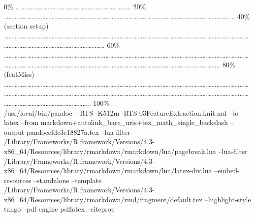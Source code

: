 \documentclass[
]{article}
\begin{document}
\textbar{} \textbar{} \textbar{} 0\% \textbar{}
\textbar\ldots\ldots\ldots\ldots\ldots\ldots\ldots\ldots\ldots\ldots\ldots\ldots\ldots\ldots\ldots\ldots\ldots\ldots\ldots\ldots\ldots\ldots\ldots\ldots\ldots{}
\textbar{} 20\% \textbar{}
\textbar\ldots\ldots\ldots\ldots\ldots\ldots\ldots\ldots\ldots\ldots\ldots\ldots\ldots\ldots\ldots\ldots\ldots\ldots\ldots\ldots\ldots\ldots\ldots\ldots\ldots\ldots\ldots\ldots\ldots\ldots\ldots\ldots\ldots\ldots\ldots\ldots\ldots\ldots\ldots\ldots\ldots\ldots\ldots\ldots\ldots\ldots\ldots\ldots\ldots\ldots{}
\textbar{} 40\% (section setup) \textbar{}
\textbar\ldots\ldots\ldots\ldots\ldots\ldots\ldots\ldots\ldots\ldots\ldots\ldots\ldots\ldots\ldots\ldots\ldots\ldots\ldots\ldots\ldots\ldots\ldots\ldots\ldots\ldots\ldots\ldots\ldots\ldots\ldots\ldots\ldots\ldots\ldots\ldots\ldots\ldots\ldots\ldots\ldots\ldots\ldots\ldots\ldots\ldots\ldots\ldots\ldots\ldots\ldots\ldots\ldots\ldots\ldots\ldots\ldots\ldots\ldots\ldots\ldots\ldots\ldots\ldots\ldots\ldots\ldots\ldots\ldots\ldots\ldots\ldots\ldots\ldots..
\textbar{} 60\% \textbar{}
\textbar\ldots\ldots\ldots\ldots\ldots\ldots\ldots\ldots\ldots\ldots\ldots\ldots\ldots\ldots\ldots\ldots\ldots\ldots\ldots\ldots\ldots\ldots\ldots\ldots\ldots\ldots\ldots\ldots\ldots\ldots\ldots\ldots\ldots\ldots\ldots\ldots\ldots\ldots\ldots\ldots\ldots\ldots\ldots\ldots\ldots\ldots\ldots\ldots\ldots\ldots\ldots\ldots\ldots\ldots\ldots\ldots\ldots\ldots\ldots\ldots\ldots\ldots\ldots\ldots\ldots\ldots\ldots\ldots\ldots\ldots\ldots\ldots\ldots\ldots\ldots\ldots\ldots\ldots\ldots\ldots\ldots\ldots\ldots\ldots\ldots\ldots\ldots\ldots\ldots\ldots\ldots\ldots\ldots\ldots\ldots\ldots\ldots\ldots\ldots..
\textbar{} 80\% (featMiss) \textbar{}
\textbar\ldots\ldots\ldots\ldots\ldots\ldots\ldots\ldots\ldots\ldots\ldots\ldots\ldots\ldots\ldots\ldots\ldots\ldots\ldots\ldots\ldots\ldots\ldots\ldots\ldots\ldots\ldots\ldots\ldots\ldots\ldots\ldots\ldots\ldots\ldots\ldots\ldots\ldots\ldots\ldots\ldots\ldots\ldots\ldots\ldots\ldots\ldots\ldots\ldots\ldots\ldots\ldots\ldots\ldots\ldots\ldots\ldots\ldots\ldots\ldots\ldots\ldots\ldots\ldots\ldots\ldots\ldots\ldots\ldots\ldots\ldots\ldots\ldots\ldots\ldots\ldots\ldots\ldots\ldots\ldots\ldots\ldots\ldots\ldots\ldots\ldots\ldots\ldots\ldots\ldots\ldots\ldots\ldots\ldots\ldots\ldots\ldots\ldots\ldots\ldots\ldots\ldots\ldots\ldots\ldots\ldots\ldots\ldots\ldots\ldots\ldots\ldots\ldots\ldots\ldots\ldots\ldots\ldots\ldots\ldots\ldots\ldots\ldots\ldots..\textbar{}
100\%\\
/usr/local/bin/pandoc +RTS -K512m -RTS 03FeatureExtraction.knit.md --to
latex --from markdown+autolink\_bare\_uris+tex\_math\_single\_backslash
--output pandocefdc3e18827a.tex --lua-filter
/Library/Frameworks/R.framework/Versions/4.3-x86\_64/Resources/library/rmarkdown/rmarkdown/lua/pagebreak.lua
--lua-filter
/Library/Frameworks/R.framework/Versions/4.3-x86\_64/Resources/library/rmarkdown/rmarkdown/lua/latex-div.lua
--embed-resources --standalone --template
/Library/Frameworks/R.framework/Versions/4.3-x86\_64/Resources/library/rmarkdown/rmd/fragment/default.tex
--highlight-style tango --pdf-engine pdflatex --citeproc
\end{document}
